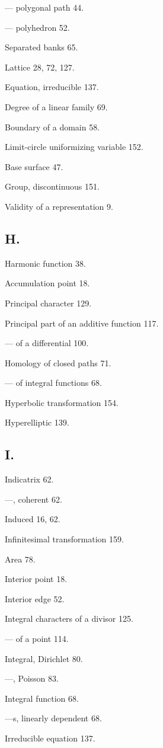 \documentclass{article}
\begin{document}
--- polygonal path 44.

--- polyhedron 52.

Separated banks 65.

Lattice 28, 72, 127.

Equation, irreducible 137.

Degree of a linear family 69.

Boundary of a domain 58.

Limit-circle uniformizing variable 152.

Base surface 47.

Group, discontinuous 151.

Validity of a representation 9.

\subsection*{H.}

Harmonic function 38.

Accumulation point 18.

Principal character 129.

Principal part of an additive function 117.

--- of a differential 100.

Homology of closed paths 71.

--- of integral functions 68.

Hyperbolic transformation 154.

Hyperelliptic 139.

\subsection*{I.}

Indicatrix 62.

---, coherent 62.

Induced 16, 62.

Infinitesimal transformation 159.

Area 78.

Interior point 18.

Interior edge 52.

Integral characters of a divisor 125.

--- of a point 114.

Integral, Dirichlet 80.

---, Poisson 83.

Integral function 68.

---s, linearly dependent 68.

Irreducible equation 137.
\end{document}
